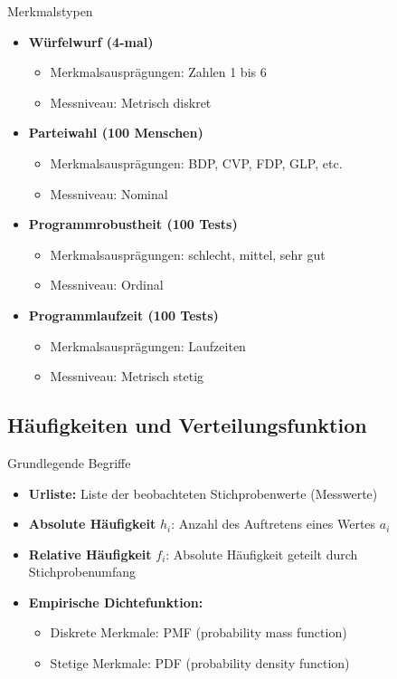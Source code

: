 \begin{example2}{Merkmalstypen}
    \small
\begin{itemize}
    \item \textbf{Würfelwurf (4-mal)}
    \begin{itemize}
        \item Merkmalsausprägungen: Zahlen 1 bis 6
        \item Messniveau: Metrisch diskret
    \end{itemize}
    
    \item \textbf{Parteiwahl (100 Menschen)}
    \begin{itemize}
        \item Merkmalsausprägungen: BDP, CVP, FDP, GLP, etc.
        \item Messniveau: Nominal
    \end{itemize}
    
    \item \textbf{Programmrobustheit (100 Tests)}
    \begin{itemize}
        \item Merkmalsausprägungen: schlecht, mittel, sehr gut
        \item Messniveau: Ordinal
    \end{itemize}
    
    \item \textbf{Programmlaufzeit (100 Tests)}
    \begin{itemize}
        \item Merkmalsausprägungen: Laufzeiten
        \item Messniveau: Metrisch stetig
    \end{itemize}
\end{itemize}
\end{example2}

\subsection{Häufigkeiten und Verteilungsfunktion}

\begin{concept}{Grundlegende Begriffe}
\begin{itemize}
    \item \textbf{Urliste:} Liste der beobachteten Stichprobenwerte (Messwerte)
    \item \textbf{Absolute Häufigkeit} $h_i$: Anzahl des Auftretens eines Wertes $a_i$
    \item \textbf{Relative Häufigkeit} $f_i$: Absolute Häufigkeit geteilt durch Stichprobenumfang
    \item \textbf{Empirische Dichtefunktion:} 
    \begin{itemize}
        \item Diskrete Merkmale: PMF (probability mass function)
        \item Stetige Merkmale: PDF (probability density function)
    \end{itemize}
\end{itemize}
\end{concept}

